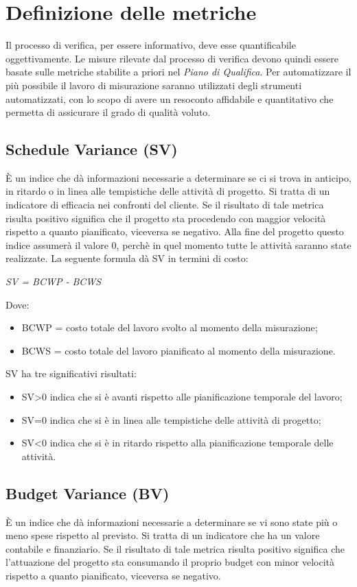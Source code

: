 \section{Definizione delle metriche}

Il processo di verifica, per essere informativo, deve esse quantificabile oggettivamente. Le misure rilevate dal processo di verifica devono quindi essere basate sulle metriche stabilite a priori nel \textit{Piano di Qualifica}. Per automatizzare il più possibile il lavoro di misurazione saranno utilizzati degli strumenti automatizzati, con lo scopo di avere un resoconto affidabile e quantitativo che permetta di assicurare il grado di qualità voluto.

  \subsection{Schedule Variance (SV)}
  È un indice che dà informazioni necessarie a determinare se ci si trova in anticipo, in ritardo o in linea alle tempistiche delle attività di progetto. Si tratta di un indicatore di efficacia nei confronti del cliente. Se il risultato di tale metrica risulta positivo significa che il progetto sta procedendo con maggior velocità rispetto a quanto pianificato, viceversa
se negativo. Alla fine del progetto questo indice assumerà il valore 0, perchè in quel momento tutte le attività saranno state realizzate.
La seguente formula dà SV in termini di costo:
  \begin{center}
    \emph{SV = BCWP - BCWS}
  \end{center}
  Dove:
  \begin{itemize}
    \item BCWP = costo totale del lavoro svolto al momento della misurazione;
    \item BCWS = costo totale del lavoro pianificato al momento della misurazione.
  \end{itemize}
  SV ha tre significativi risultati:
  \begin{itemize}
    \item SV>0 indica che si è avanti rispetto alle pianificazione temporale del lavoro;
    \item SV=0 indica che si è in linea alle tempistiche delle attività di progetto;
    \item SV<0 indica che si è in ritardo rispetto alla pianificazione temporale delle attività.
  \end{itemize}

  \subsection{Budget Variance (BV)}
  È un indice che dà informazioni necessarie a determinare se vi sono state più o meno spese rispetto al previsto. Si tratta di un indicatore che ha un valore contabile e finanziario. Se il risultato di tale metrica risulta positivo significa che l'attuazione del progetto sta consumando il proprio budget con minor velocità rispetto a quanto pianificato, viceversa se negativo.

